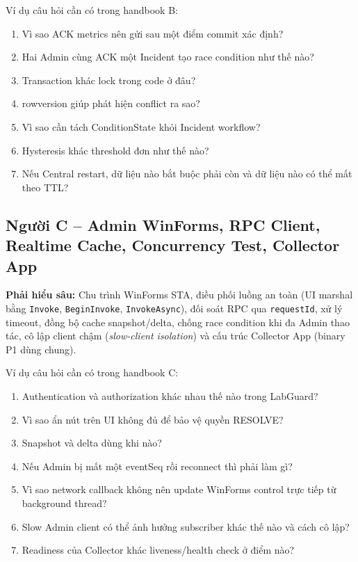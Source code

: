 \begin{vivabox}
Ví dụ câu hỏi cần có trong handbook B:
\begin{enumerate}
    \item Vì sao ACK metrics nên gửi sau một điểm commit xác định?
    \item Hai Admin cùng ACK một Incident tạo race condition như thế nào?
    \item Transaction khác lock trong code ở đâu?
    \item rowversion giúp phát hiện conflict ra sao?
    \item Vì sao cần tách ConditionState khỏi Incident workflow?
    \item Hysteresis khác threshold đơn như thế nào?
    \item Nếu Central restart, dữ liệu nào bắt buộc phải còn và dữ liệu nào có thể mất theo TTL?
\end{enumerate}
\end{vivabox}

\subsection*{Người C -- Admin WinForms, RPC Client, Realtime Cache, Concurrency Test, Collector App}

\textbf{Phải hiểu sâu:} Chu trình WinForms STA, điều phối luồng an toàn (UI marshal bằng \texttt{Invoke}, \texttt{BeginInvoke}, \texttt{InvokeAsync}), đối soát RPC qua \texttt{requestId}, xử lý timeout, đồng bộ cache snapshot/delta, chống race condition khi đa Admin thao tác, cô lập client chậm (\textit{slow-client isolation}) và cấu trúc Collector App (binary P1 dùng chung).

\begin{vivabox}
Ví dụ câu hỏi cần có trong handbook C:
\begin{enumerate}
    \item Authentication và authorization khác nhau thế nào trong LabGuard?
    \item Vì sao ẩn nút trên UI không đủ để bảo vệ quyền RESOLVE?
    \item Snapshot và delta dùng khi nào?
    \item Nếu Admin bị mất một eventSeq rồi reconnect thì phải làm gì?
    \item Vì sao network callback không nên update WinForms control trực tiếp từ background thread?
    \item Slow Admin client có thể ảnh hưởng subscriber khác thế nào và cách cô lập?
    \item Readiness của Collector khác liveness/health check ở điểm nào?
\end{enumerate}
\end{vivabox}

